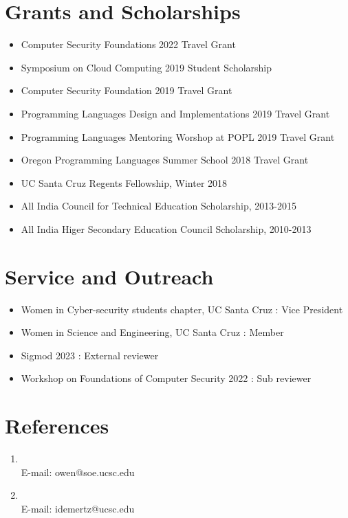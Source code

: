 \documentclass[9pt,a4paper]{moderncv}
\begin{document}
\section{Grants and Scholarships} 
\begin{itemize}
\item Computer Security Foundations 2022 Travel Grant
\item Symposium on Cloud Computing 2019 Student Scholarship
\item Computer Security Foundation 2019 Travel Grant
\item Programming Languages Design and Implementations 2019 Travel Grant
\item Programming Languages Mentoring Worshop at POPL 2019 Travel Grant
\item Oregon Programming Languages Summer School 2018 Travel Grant 
\item UC Santa Cruz Regents Fellowship, Winter 2018
\item All India Council for Technical Education Scholarship, 2013-2015
\item All India Higer Secondary Education Council Scholarship, 2010-2013
\end{itemize}
\section{Service and Outreach}
\begin{itemize}
\item Women in Cyber-security students chapter, UC Santa Cruz : Vice President
\item Women in Science and Engineering, UC Santa Cruz : Member
\item Sigmod 2023 : External reviewer
\item Workshop on Foundations of Computer Security 2022 : Sub reviewer
\end{itemize}
\section{References}
\begin{enumerate}
\item \underline{} 
\\
E-mail: owen@soe.ucsc.edu \\
\item \underline{} 
\\
E-mail: idemertz@ucsc.edu \\
\vspace{6 mm}
\end{enumerate}
\end{document}
